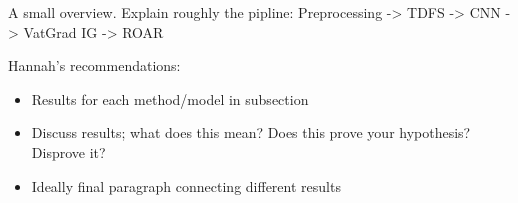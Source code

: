 A small overview. Explain roughly the pipline: Preprocessing -> TDFS -> CNN -> VatGrad IG -> ROAR

Hannah's recommendations:
\begin{itemize}
  \item Results for each method/model in subsection
  \item Discuss results; what does this mean? Does this prove your hypothesis? Disprove it?
  \item Ideally final paragraph connecting different results
\end{itemize}
